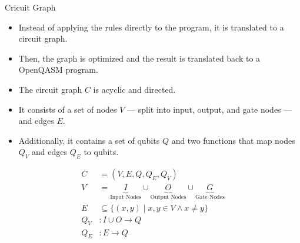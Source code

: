 \begin{frame}{Cricuit Graph}
    \begin{itemize}
        \item Instead of applying the rules directly to the program, it is translated to a circuit graph.
        \item Then, the graph is optimized and the result is translated back to a OpenQASM program.
        \item The circuit graph $C$ is acyclic and directed.
        \item It consists of a set of nodes $V$ --- split into input, output, and gate nodes --- and edges $E$.
        \item Additionally, it contains a set of qubits $Q$ and two functions that map nodes $Q_V$ and edges $Q_E$ to qubits.
    \end{itemize}
    \vfill
    \begin{align*}
        C &= (V, E, Q, Q_E, Q_V)\\
        V &= \underbrace{I}_{\text{Input Nodes}} \cup \underbrace{O}_{\text{Output Nodes}} \cup \underbrace{G}_{\text{Gate Nodes}}\\
        E &\subseteq \{ (x, y) \mid x,y \in V \land x \neq y \}\\
        Q_V &: I \cup O \to Q \\
        Q_E &: E \to Q
    \end{align*}
\end{frame}

